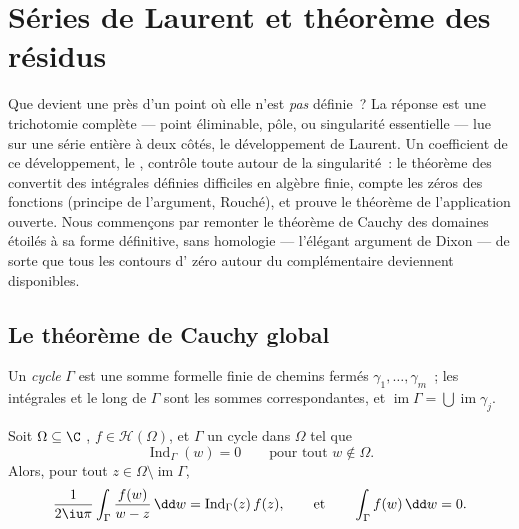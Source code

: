 \chapter{Séries de Laurent et théorème des résidus}
\label{ch:b3:residues}

Que devient une  près d'un point où elle
n'est \emph{pas} définie~? La réponse est une trichotomie
complète --- point éliminable, pôle, ou singularité
essentielle --- lue sur une série entière à deux côtés, le
développement de Laurent. Un coefficient de ce développement,
le \emph{}, contrôle toute  autour
de la singularité~: le théorème des  convertit des
intégrales définies difficiles en algèbre finie, compte les
zéros des fonctions (principe de l'argument, Rouché), et
prouve le théorème de l'application ouverte. Nous commençons
par remonter le théorème de Cauchy des domaines étoilés à sa
forme définitive, sans homologie --- l'élégant argument de
Dixon --- de sorte que tous les contours d' zéro autour
du complémentaire deviennent disponibles.

\section{Le théorème de Cauchy global}

Un \emph{cycle} $\Gamma$ est une somme formelle
finie de chemins fermés $\gamma_1, \dots, \gamma_m$~; les
intégrales et  le long de $\Gamma$ sont les sommes
correspondantes, et $\operatorname{im}\Gamma =
\bigcup\operatorname{im}\gamma_j$.

\begin{theorem}
\label{thm:b3:residues:globalcauchy}
Soit $\Omega \subseteq \C$ , $f \in \mathcal H(\Omega)$,
et $\Gamma$ un cycle dans $\Omega$ tel que
\[
\operatorname{Ind}_\Gamma(w) = 0
\qquad\text{pour tout } w \notin \Omega .
\]
Alors, pour tout $z \in \Omega\setminus\operatorname{im}\Gamma$,
\[
\frac1{2\iu\pi}\int_\Gamma\frac{f(w)}{w - z}\,\dd w =
\operatorname{Ind}_\Gamma(z)\,f(z),
\qquad\text{et}\qquad
\int_\Gamma f(w)\,\dd w = 0 .
\]
\end{theorem}

